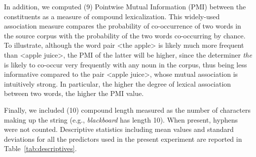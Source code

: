 \documentclass[output=paper]{langsci/langscibook}
\begin{document}
In addition, we computed (9) Pointwise Mutual Information (PMI) between the constituents as a measure of compound lexicalization. This widely-used association measure \citep{church1990} compares the probability of co-occurrence of two words in the source corpus with the probability of the two words co-occurring by chance. To illustrate, although the word pair <the apple> is likely much more frequent than <apple juice>, the PMI of the latter will be higher, since the determiner \emph{the} is likely to co-occur very frequently with any noun in the corpus, thus being less informative compared to the pair <apple juice>, whose mutual association is intuitively strong. In particular, the higher the degree of lexical association between two words, the higher the PMI value.

Finally, we included (10) compound length measured as the number of characters making up the string (e.g., \emph{blackboard} has length 10). When present, hyphens were not counted. Descriptive statistics including mean values and standard deviations for all the predictors used in the present experiment are reported in Table~\ref{tab:descriptives}.
\end{document}
